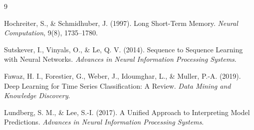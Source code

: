 \documentclass[12pt,a4paper]{report}
\begin{document}
	\begin{thebibliography}{9}
		
		Hochreiter, S., \& Schmidhuber, J. (1997).
		Long Short-Term Memory.
		\textit{Neural Computation}, 9(8), 1735–1780.
		
		Sutskever, I., Vinyals, O., \& Le, Q. V. (2014).
		Sequence to Sequence Learning with Neural Networks.
		\textit{Advances in Neural Information Processing Systems}.
		
		Fawaz, H. I., Forestier, G., Weber, J., Idoumghar, L., \& Muller, P.-A. (2019).
		Deep Learning for Time Series Classification: A Review.
		\textit{Data Mining and Knowledge Discovery}.
		
		Lundberg, S. M., \& Lee, S.-I. (2017).
		A Unified Approach to Interpreting Model Predictions.
		\textit{Advances in Neural Information Processing Systems}.
		
	\end{thebibliography}
	
\end{document}
